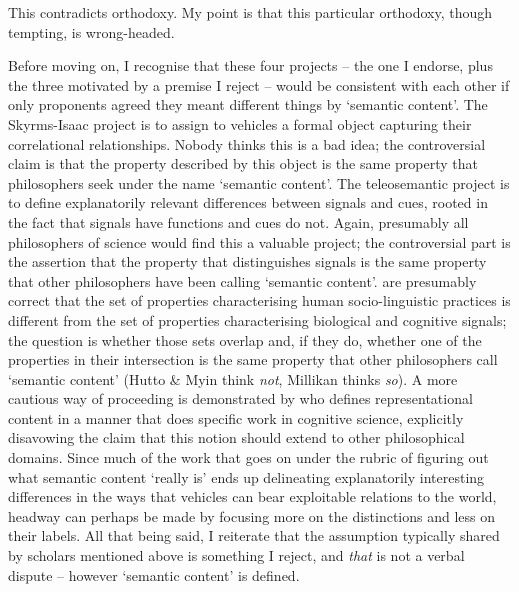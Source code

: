 \noindent This contradicts orthodoxy.
My point is that this particular orthodoxy, though tempting, is wrong-headed.

Before moving on, I recognise that these four projects -- the one I endorse, plus the three motivated by a premise I reject -- would be consistent with each other if only proponents agreed they meant different things by `semantic content'.
The Skyrms-Isaac project is to assign to vehicles a formal object capturing their correlational relationships.
Nobody thinks this is a bad idea; the controversial claim is that the property described by this object is the same property that philosophers seek under the name `semantic content'.
The teleosemantic project is to define explanatorily relevant differences between signals and cues, rooted in the fact that signals have functions and cues do not.
Again, presumably all philosophers of science would find this a valuable project; the controversial part is the assertion that the property that distinguishes signals is the same property that other philosophers have been calling `semantic content'.
\citet{hutto2013radicalizing} are presumably correct that the set of properties characterising human socio-linguistic practices is different from the set of properties characterising biological and cognitive signals; the question is whether those sets overlap and, if they do, whether one of the properties in their intersection is the same property that other philosophers call `semantic content' (Hutto \& Myin think \textit{not}, Millikan thinks \textit{so}).
A more cautious way of proceeding is demonstrated by \citet{shea2018representation} who defines representational content in a manner that does specific work in cognitive science, explicitly disavowing the claim that this notion should extend to other philosophical domains.
Since much of the work that goes on under the rubric of figuring out what semantic content `really is' ends up delineating explanatorily interesting differences in the ways that vehicles can bear exploitable relations to the world, headway can perhaps be made by focusing more on the distinctions and less on their labels.
All that being said, I reiterate that the assumption typically shared by scholars mentioned above is something I reject, and \textit{that} is not a verbal dispute -- however `semantic content' is defined.

